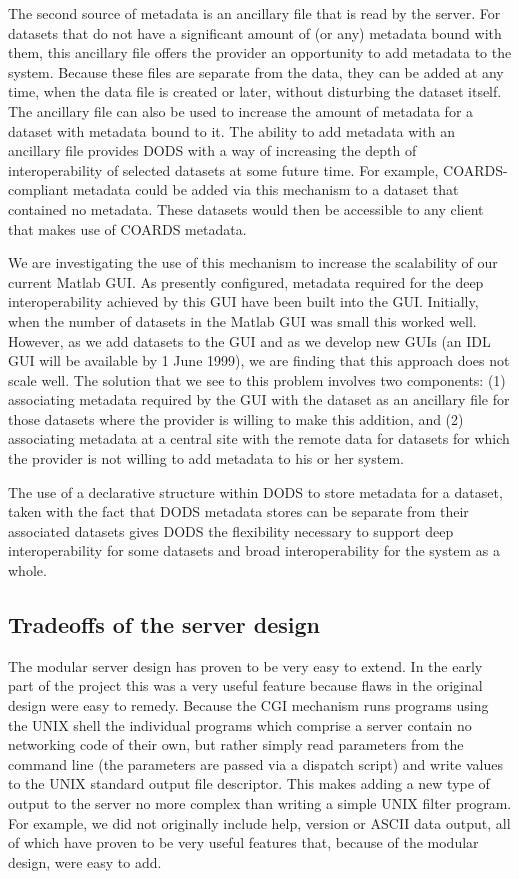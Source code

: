 \documentclass{article}
\begin{document}
The second source of metadata is an ancillary file that is read by the
server. For datasets that do not have a significant amount of (or any)
metadata bound with them, this ancillary file offers the provider an
opportunity to add metadata to the system. Because these files are separate
from the data, they can be added at any time, when the data file is created
or later, without disturbing the dataset itself.  The ancillary file can also
be used to increase the amount of metadata for a dataset with metadata bound
to it.  The ability to add metadata with an ancillary file provides \ac{DODS}
with a way of increasing the depth of interoperability of selected datasets
at some future time. For example, \acs{COARDS}-compliant metadata could be
added via this mechanism to a dataset that contained no metadata.  These
datasets would then be accessible to any client that makes use of
\acs{COARDS} metadata.

We are investigating the use of this mechanism to increase the scalability of
our current Matlab \ac{GUI}. As presently configured, metadata required for
the deep interoperability achieved by this \ac{GUI} have been built into the
\ac{GUI}.  Initially, when the number of datasets in the Matlab \ac{GUI} was
small this worked well.  However, as we add datasets to the \ac{GUI} and as
we develop new \ac{GUI}s (an IDL \ac{GUI} will be available by 1 June 1999),
we are finding that this approach does not scale well.  The solution that we
see to this problem involves two components: (1) associating metadata
required by the \ac{GUI} with the dataset as an ancillary file for those
datasets where the provider is willing to make this addition, and (2)
associating metadata at a central site with the remote data for datasets for
which the provider is not willing to add metadata to his or her system.

The use of a declarative structure within \ac{DODS} to store metadata for a
dataset, taken with the fact that \ac{DODS} metadata stores can be separate
from their associated datasets gives \ac{DODS} the flexibility necessary to
support deep interoperability for some datasets and broad interoperability
for the system as a whole.

\subsection{Tradeoffs of the server design}
\label{dserver}

The modular server design has proven to be very easy to extend. In the early
part of the project this was a very useful feature because flaws in the
original design were easy to remedy. Because the \ac{CGI} mechanism runs
programs using the UNIX shell the individual programs which comprise a server
contain no networking code of their own, but rather simply read parameters
from the command line (the parameters are passed via a dispatch script) and
write values to the UNIX standard output file descriptor. This makes adding a
new type of output to the server no more complex than writing a simple UNIX
filter program. For example, we did not originally include help, version or
ASCII data output, all of which have proven to be very useful features that,
because of the modular design, were easy to add.
\end{document}
